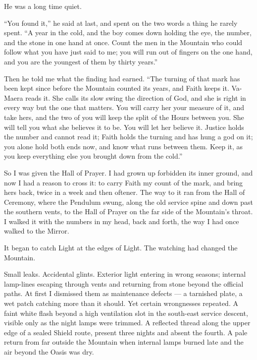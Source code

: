 He was a long time quiet.\par

``You found it,'' he said at last, and spent on the two words a thing he rarely spent. ``A year in the cold, and the boy comes down holding the eye, the number, and the stone in one hand at once. Count the men in the Mountain who could follow what you have just said to me; you will run out of fingers on the one hand, and you are the youngest of them by thirty years.''\par

Then he told me what the finding had earned. ``The turning of that mark has been kept since before the Mountain counted its years, and Faith keeps it. Va-Maera reads it. She calls its slow swing the direction of God, and she is right in every way but the one that matters. You will carry her your measure of it, and take hers, and the two of you will keep the split of the Hours between you. She will tell you what she believes it to be. You will let her believe it. Justice holds the number and cannot read it; Faith holds the turning and has hung a god on it; you alone hold both ends now, and know what runs between them. Keep it, as you keep everything else you brought down from the cold.''\par

So I was given the Hall of Prayer. I had grown up forbidden its inner ground, and now I had a reason to cross it: to carry Faith my count of the mark, and bring hers back, twice in a week and then oftener. The way to it ran from the Hall of Ceremony, where the Pendulum swung, along the old service spine and down past the southern vents, to the Hall of Prayer on the far side of the Mountain's throat. I walked it with the numbers in my head, back and forth, the way I had once walked to the Mirror.\par

It began to catch Light at the edges of Light. The watching had changed the Mountain.\par

Small leaks. Accidental glints. Exterior light entering in wrong seasons; internal lamp-lines escaping through vents and returning from stone beyond the official paths. At first I dismissed them as maintenance defects --- a tarnished plate, a wet patch catching more than it should. Yet certain wrongnesses repeated. A faint white flash beyond a high ventilation slot in the south-east service descent, visible only as the night lamps were trimmed. A reflected thread along the upper edge of a sealed Shield route, present three nights and absent the fourth. A pale return from far outside the Mountain when internal lamps burned late and the air beyond the Oasis was dry.\par

